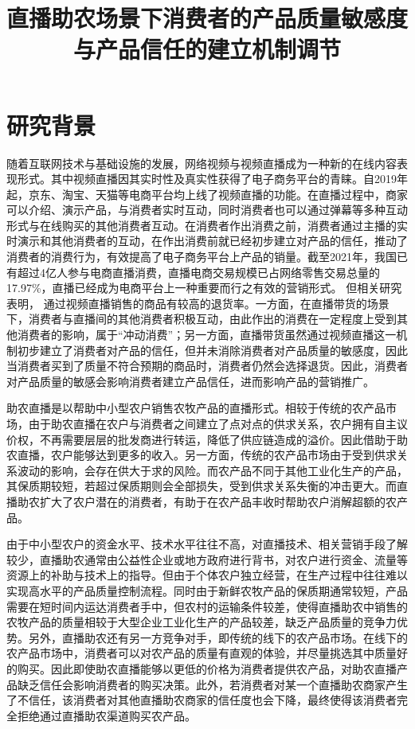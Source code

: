 \documentclass{../notes}
\title{直播助农场景下消费者的产品质量敏感度与产品信任的建立机制调节}
\begin{document}
    \maketitle

    \section{研究背景}

    随着互联网技术与基础设施的发展，网络视频与视频直播成为一种新的在线内容表现形式。其中视频直播因其实时性及真实性获得了电子商务平台的青睐。自2019年起，京东、淘宝、天猫等电商平台均上线了视频直播的功能。在直播过程中，商家可以介绍、演示产品，与消费者实时互动，同时消费者也可以通过弹幕等多种互动形式与在线购买的其他消费者互动。在消费者作出消费之前，消费者通过主播的实时演示和其他消费者的互动，在作出消费前就已经初步建立对产品的信任，推动了消费者的消费行为，有效提高了电子商务平台上产品的销量。截至2021年，我国已有超过4亿人参与电商直播消费，直播电商交易规模已占网络零售交易总量的17.97\%，直播已经成为电商平台上一种重要而行之有效的营销形式\cite{noauthor_2021}。
    但相关研究表明， %
    通过视频直播销售的商品有较高的退货率\cite{gong2021, liu2021}。一方面，在直播带货的场景下，消费者与直播间的其他消费者积极互动，由此作出的消费在一定程度上受到其他消费者的影响，属于“冲动消费”；另一方面，直播带货虽然通过视频直播这一机制初步建立了消费者对产品的信任，但并未消除消费者对产品质量的敏感度，因此当消费者买到了质量不符合预期的商品时，消费者仍然会选择退货。因此，消费者对产品质量的敏感会影响消费者建立产品信任，进而影响产品的营销推广。

    助农直播是以帮助中小型农户销售农牧产品的直播形式。相较于传统的农产品市场，由于助农直播在农户与消费者之间建立了点对点的供求关系，农户拥有自主议价权，不再需要层层的批发商进行转运，降低了供应链造成的溢价。因此借助于助农直播，农户能够达到更多的收入。另一方面，传统的农产品市场由于受到供求关系波动的影响，会存在供大于求的风险。而农产品不同于其他工业化生产的产品，其保质期较短，若超过保质期则会全部损失，受到供求关系失衡的冲击更大。而直播助农扩大了农户潜在的消费者，有助于在农产品丰收时帮助农户消解超额的农产品。

    由于中小型农户的资金水平、技术水平往往不高，对直播技术、相关营销手段了解较少，直播助农通常由公益性企业或地方政府进行背书，对农户进行资金、流量等资源上的补助与技术上的指导。但由于个体农户独立经营，在生产过程中往往难以实现高水平的产品质量控制流程。同时由于新鲜农牧产品的保质期通常较短，产品需要在短时间内运达消费者手中，但农村的运输条件较差，使得直播助农中销售的农牧产品的质量相较于大型企业工业化生产的产品较差，缺乏产品质量的竞争力优势。另外，直播助农还有另一方竞争对手，即传统的线下的农产品市场。在线下的农产品市场中，消费者可以对农产品的质量有直观的体验，并尽量挑选其中质量好的购买。因此即使助农直播能够以更低的价格为消费者提供农产品，对助农直播产品缺乏信任会影响消费者的购买决策。此外，若消费者对某一个直播助农商家产生了不信任，该消费者对其他直播助农商家的信任度也会下降，最终使得该消费者完全拒绝通过直播助农渠道购买农产品。
\end{document}
